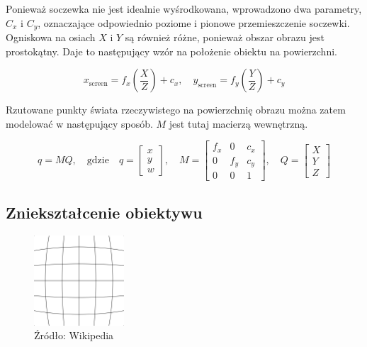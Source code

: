 \documentclass[magisterska]{pracadypl}
\begin{document}
Ponieważ soczewka nie jest idealnie wyśrodkowana, wprowadzono dwa parametry, $C_x$ i $C_y$, oznaczające odpowiednio poziome i pionowe przemieszczenie soczewki.
Ogniskowa na osiach $X$ i $Y$ są również różne, ponieważ obszar obrazu jest prostokątny. Daje to następujący wzór na położenie obiektu na powierzchni.

\[
x_{\text{screen}} = f_x \left( \frac{X}{Z} \right) + c_x, \quad
y_{\text{screen}} = f_y \left( \frac{Y}{Z} \right) + c_y
\]

Rzutowane punkty świata rzeczywistego na powierzchnię obrazu można zatem modelować w następujący sposób. $M$ jest tutaj macierzą wewnętrzną.

\[
q = MQ, \quad \text{gdzie} \quad
q = \begin{bmatrix} x \\ y \\ w \end{bmatrix}, \quad
M = \begin{bmatrix}
f_x & 0 & c_x \\
0 & f_y & c_y \\
0 & 0 & 1
\end{bmatrix}, \quad
Q = \begin{bmatrix} X \\ Y \\ Z \end{bmatrix}
\]

\subsection{Zniekształcenie obiektywu}

\begin{figure}[h]  %
    \centering  %
    \includegraphics[width=0.3\textwidth]{images/barrel.png}  %
    \captionsetup{labelformat=empty, font=footnotesize}
    \caption{Źródło: Wikipedia}
    \label{fig:rpi}  %
\end{figure}
\end{document}
